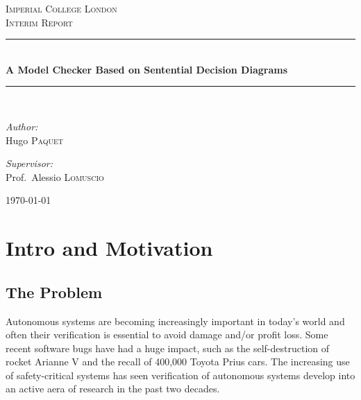 \documentclass{article}
\newcommand{\HRule}{\rule{\linewidth}{0.5mm}}
\begin{document}
 
\begin{titlepage}
\begin{center}


\textsc{\LARGE Imperial College London}\\[1.5cm]

\textsc{\Large Interim Report}\\[0.5cm]

\HRule \\[0.4cm]
{ \huge \bfseries A Model Checker Based on Sentential Decision Diagrams \\[0.4cm] }

\HRule \\[1.5cm]

\begin{minipage}{0.4\textwidth}
\begin{flushleft} \large
\emph{Author:}\\
Hugo \textsc{Paquet}
\end{flushleft}
\end{minipage}
\begin{minipage}{0.4\textwidth}
\begin{flushright} \large
\emph{Supervisor:} \\
Prof.~Alessio\textsc{ Lomuscio}
\end{flushright}
\end{minipage}

\vfill

{\large \today}

\end{center}
\end{titlepage}

 \tableofcontents 
\clearpage
\section{Intro and Motivation}

\subsection{The Problem}

Autonomous systems are becoming increasingly important in today's world and often their verification is essential to avoid damage and/or profit loss.  Some recent software bugs have had a huge impact, such as the self-destruction of rocket Arianne V and the recall of 400,000 Toyota Prius cars.
The increasing use of safety-critical systems has seen verification of autonomous systems develop into an active aera of research in the past two decades. 
\end{document}
